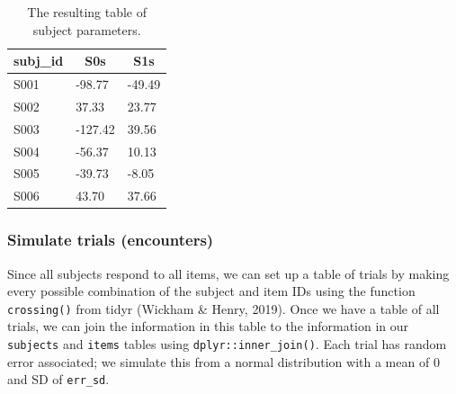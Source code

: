 \documentclass[doc,floatsintext]{apa6}
\newenvironment{Shaded}{\begin{snugshade}}{\end{snugshade}}
\newcommand{\CommentTok}[1]{\textcolor[rgb]{0.56,0.35,0.01}{\textit{#1}}}
\newcommand{\DataTypeTok}[1]{\textcolor[rgb]{0.13,0.29,0.53}{#1}}
\newcommand{\DecValTok}[1]{\textcolor[rgb]{0.00,0.00,0.81}{#1}}
\newcommand{\KeywordTok}[1]{\textcolor[rgb]{0.13,0.29,0.53}{\textbf{#1}}}
\newcommand{\NormalTok}[1]{#1}
\newcommand{\OperatorTok}[1]{\textcolor[rgb]{0.81,0.36,0.00}{\textbf{#1}}}
\newcommand{\StringTok}[1]{\textcolor[rgb]{0.31,0.60,0.02}{#1}}
\begin{document}
\begin{table}[H]
\begin{center}
\begin{threeparttable}
\caption{\label{tab:subj-table}The resulting table of subject parameters.}
\begin{tabular}{lll}
\toprule
subj\_id & \multicolumn{1}{c}{S0s} & \multicolumn{1}{c}{S1s}\\
\midrule
S001 & -98.77 & -49.49\\
S002 & 37.33 & 23.77\\
S003 & -127.42 & 39.56\\
S004 & -56.37 & 10.13\\
S005 & -39.73 & -8.05\\
S006 & 43.70 & 37.66\\
\bottomrule
\end{tabular}
\end{threeparttable}
\end{center}
\end{table}

\hypertarget{simulate-trials-encounters}{%
\subsubsection{Simulate trials (encounters)}\label{simulate-trials-encounters}}

Since all subjects respond to all items, we can set up a table of trials by making every possible combination of the subject and item IDs using the function \texttt{crossing()} from tidyr (Wickham \& Henry, 2019). Once we have a table of all trials, we can join the information in this table to the information in our \texttt{subjects} and \texttt{items} tables using \texttt{dplyr::inner\_join()}. Each trial has random error associated; we simulate this from a normal distribution with a mean of 0 and SD of \texttt{err\_sd}.

\begin{Shaded}
\end{Shaded}
\end{document}
